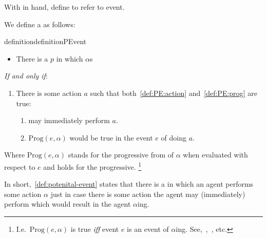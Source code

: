 \begin{note}
  With \assuPP{} in hand, define \pevent{} to refer to event.

  We define a \pevent{} as follows:
  \begin{restatable}[\pevent{3}]{definition}{definitionPEvent}
    \label{def:potenital-event}

    \begin{itemize}
    \item
      There is a \pevent{} \(p\) in which \vAgent{} \(\alpha\)s
    \end{itemize}

    \emph{If and only if}:

    \begin{enumerate}[label=]
    \item
      There is some action \(a\) such that both~\ref{def:PE:action} and~\ref{def:PE:prog} are true:
      \begin{enumerate}[label=\alph*., ref=(\alph*)]
      \item
        \label{def:PE:action}
        \vAgent{} may immediately perform \(a\).
      \item
        \label{def:PE:prog}
        \(\text{Prog}(e, \alpha)\) would be true in the event \(e\) of \vAgent{} doing \(a\).
      \end{enumerate}
    \end{enumerate}

    Where \(\text{Prog}(e, \alpha)\) stands for the progressive from of \(\alpha\) when evaluated with respect to \(e\) and \assuPP{} holds for the progressive.%
    \footnote{
      I.e.\ \(\text{Prog}(e, \alpha)\) is true \emph{iff} event \(e\) is an event of \(\alpha\)ing.
      See,~\textcite{Richards:1981wo},~\textcite{Portner:2011vi}, etc.
    }
  \end{restatable}

  In short,~\autoref{def:potenital-event} states that there is a \pevent{} in which an agent performs some action \(\alpha\) just in case there is some action the agent may (immediately) perform which would result in the agent \(\alpha\)ing.
\end{note}

